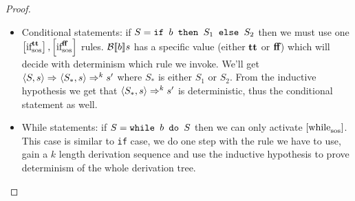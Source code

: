 \begin{proof}
\begin{itemize}
\begin{itemize}
	\end{itemize}
	\item Conditional statements: if $S=\sif{b}{S_1}{S_2}$ then we must use one $\sosrule[\true]{if}, \sosrule[\false]{if}$ rules. $\beval{b}{s}$ has a specific value (either $\true$ or $\false$) which will decide with determinism which rule we invoke. We'll get $\sostrans{S}{s}{S_{*}}{s}\Rightarrow^{k}s^\prime$ where $S_*$ is either $S_1$ or $S_2$. From the inductive hypothesis we get that $\sosftrans[k]{S_*}{s}{s^\prime}$ is deterministic, thus the conditional statement as well.
	\item While statements: if $S=\swhile{b}{S}$ then we can only activate $\sosrule{while}$. This case is similar to \texttt{if} case, we do one step with the rule we have to use, gain a $k$ length derivation sequence and use the inductive hypothesis to prove determinism of the whole derivation tree.
\end{itemize}
\end{proof}